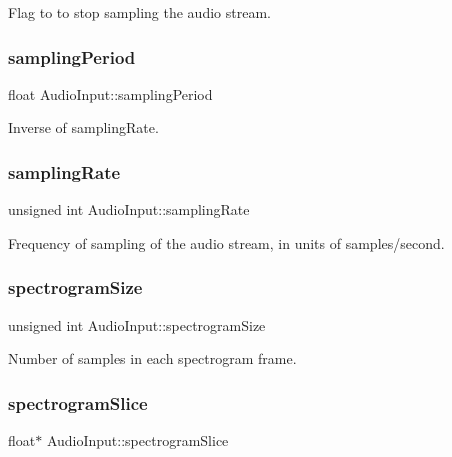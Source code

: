 Flag to to stop sampling the audio stream. \hypertarget{classAudioInput_a8b6ea4cd6b88e5cd9d051b298efbb65e}{}\label{classAudioInput_a8b6ea4cd6b88e5cd9d051b298efbb65e} 
\subsubsection{\texorpdfstring{sampling\+Period}{samplingPeriod}}
{\ttfamily float Audio\+Input\+::sampling\+Period\hspace{0.3cm}{\ttfamily [protected]}}

Inverse of sampling\+Rate. \hypertarget{classAudioInput_acfe371c4f5790bd67d282bc83225728e}{}\label{classAudioInput_acfe371c4f5790bd67d282bc83225728e} 
\subsubsection{\texorpdfstring{sampling\+Rate}{samplingRate}}
{\ttfamily unsigned int Audio\+Input\+::sampling\+Rate\hspace{0.3cm}{\ttfamily [protected]}}

Frequency of sampling of the audio stream, in units of samples/second. \hypertarget{classAudioInput_a1d4982a84d2e2e3d8a6b0f0fcdd4820e}{}\label{classAudioInput_a1d4982a84d2e2e3d8a6b0f0fcdd4820e} 
\subsubsection{\texorpdfstring{spectrogram\+Size}{spectrogramSize}}
{\ttfamily unsigned int Audio\+Input\+::spectrogram\+Size\hspace{0.3cm}{\ttfamily [protected]}}

Number of samples in each spectrogram frame. \hypertarget{classAudioInput_aa277accc3be5054fe8439ac7086deaf5}{}\label{classAudioInput_aa277accc3be5054fe8439ac7086deaf5} 
\subsubsection{\texorpdfstring{spectrogram\+Slice}{spectrogramSlice}}
{\ttfamily float$\ast$ Audio\+Input\+::spectrogram\+Slice\hspace{0.3cm}{\ttfamily [protected]}}

